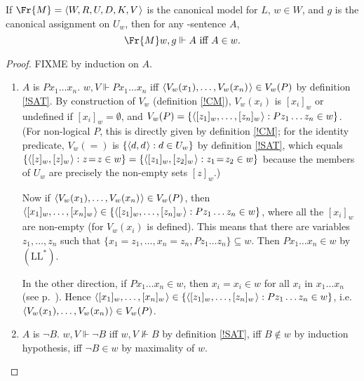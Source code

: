 \documentclass[11pt]{woarticle}
\newcommand{\cmnt}[1]{\iffalse #1 \fi}
\theoremstyle{break}
\theoremstyle{nonumberplain}
\newcommand{\SAT}{\Vdash}
\newcommand{\1}{\;\,|\;\,}
\renewcommand{\t}[1]{\ensuremath{\langle #1  \makebox[.2ex]{}\rangle}}
\newcommand{\T}[1]{\ensuremath{(\mathrm{ #1})}}
\begin{document}
\begin{lemma}\label{cml}
  If $\Fr{M} = \t{W,R,U,D,K,V}$ is the canonical model for $L$, $w\in W$, and
  $g$ is the canonical assignment on $U_{w}$, then for any -sentence $A$,
  \[
  \Fr{M}w,g \SAT A \text{ iff } A \in w.
  \]
\end{lemma}

\begin{proof}
  FIXME
  by induction on $A$.

  \begin{enumerate}

  \item $A$ is $Px_1\ldots x_n$.\; $w,V \SAT Px_1\ldots x_n$ iff
    $\t{V_w(x_1), \ldots, V_w(x_n)} \in V_w(P)$ by definition
    \ref{!SAT}. By construction of $V_w$ (definition \ref{!CM}),
    $V_w(x_i)$ is $[x_i]_w$ or undefined if $[x_i]_w = \emptyset$, and
    $V_w(P) = \{ \t{[z_1]_w,\ldots,[z_n]_w} : Pz_1\ldots z_n \in w
    \}$. (For non-logical $P$, this is directly given by definition
    \ref{!CM}; for the identity predicate, $V_w(=)$ is $\{ \t{d,d} : d
    \in U_w \}$ by definition \ref{!SAT}, which equals $\{
    \t{[z]_w,[z]_w} : z\!=\!z \in w \} = \{ \t{[z_1]_w,[z_2]_w}:
    z_1\!=\!z_2 \in w \}$ because the members of $U_w$ are precisely
    the non-empty sets $[z]_w$.)%
    \cmnt{%
      (For the last step: every $\t{[z_1]_w,[z_2]_w}$ with
      $z_1\!=\!z_2 \in w$ is a $\t{[z]_w,[z]_w}$ with $z\!=\!z \in w$,
      and every $\t{[z]_w,[z]_w}$ with $z\!=\!z \in w$ is a
      $\t{[z_1]_w,[z_2]_w}$ with $z_1\!=\!z_2 \in w$.)%
    } %

    Now if $\t{V_w(x_1), \ldots, V_w(x_n)} \in V_w(P)$, then
    $\t{[x_1]_w, \ldots, [x_n]_w} \in \{ \t{[z_1]_w,\ldots,[z_n]_w} :
    Pz_1\ldots z_n \in w \}$, where all the $[x_i]_w$ are non-empty
    (for $V_w(x_i)$ is defined). This means that there are variables
    $z_1,\ldots,z_n$ such that $\{ x_1\!=\!z_1,\ldots,x_n\!=\!z_n,
    Pz_1\ldots z_n \} \subseteq w$. Then $Px_1\ldots x_n \in w$ by
    \T{LL^*}.

    In the other direction, if $Px_1\ldots x_n \in w$, then
    $x_i\!=\!x_i \in w$ for all $x_i$ in $x_1\ldots x_n$ (see
    p.~\pageref{notenonempty}). Hence $\t{[x_1]_w, \ldots, [x_n]_w}
    \in \{ \t{[z_1]_w,\ldots,[z_n]_w} : Pz_1\ldots z_n \in w \}$,
    i.e.\ $\t{V_w(x_1), \ldots, V_w(x_n)} \in V_w(P)$.

  \item $A$ is $\neg B$.\; $w,V \SAT \neg B$ iff $w,V \not\SAT B$ by
    definition \ref{!SAT}, iff $B \not\in w$ by induction hypothesis,
    iff $\neg B \in w$ by maximality of $w$.


\end{enumerate}
\end{proof}
\end{document}
